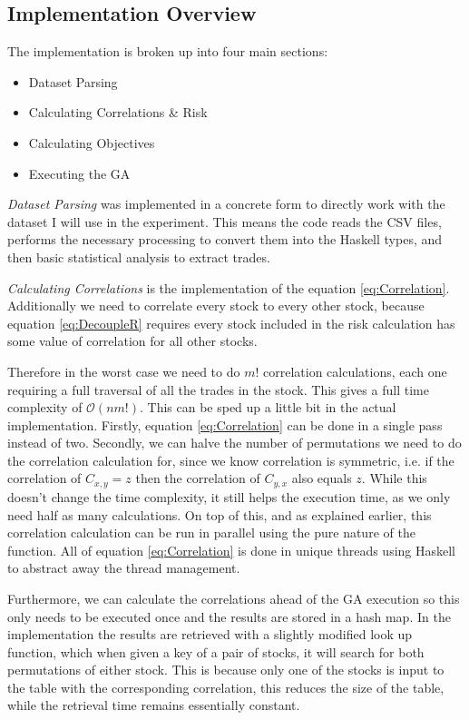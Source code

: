 \documentclass[11pt]{article}
\newcommand{\bigO}{\mathcal{O}}
\begin{document}
\subsection{Implementation Overview}

    The implementation is broken up into four main sections:

    \begin{itemize}
        \item{Dataset Parsing}
        \item{Calculating Correlations \& Risk}
        \item{Calculating Objectives}
        \item{Executing the GA}
    \end{itemize}

    \textit{Dataset Parsing} was implemented in a concrete form to directly work with the
    dataset I will use in the experiment. This means the code reads the CSV files,
    performs the necessary processing to convert them into the Haskell types, and then
    basic statistical analysis to extract trades.

    \textit{Calculating Correlations} is the implementation of the equation \ref{eq:Correlation}.
    Additionally we need to correlate every stock to every other stock, because equation
    \ref{eq:DecoupleR} requires every stock included in the risk calculation has some value of
    correlation for all other stocks.

    Therefore in the worst case we need to do \(m!\) correlation calculations, each one requiring a
    full traversal of all the trades in the stock. This gives a full time complexity of 
    \(\bigO (nm!) \). This can be sped up a little bit in the actual implementation. Firstly,
    equation \ref{eq:Correlation} can be done in a single pass instead of two. Secondly, we can
    halve the number of permutations we need to do the correlation calculation for, since we know
    correlation is symmetric, i.e. if the correlation of \(C_{x,y} = z\) then the correlation
    of \(C_{y,x}\) also equals \(z\). While this doesn't change the time complexity, it still helps
    the execution time, as we only need half as many calculations. On top of this, and as explained
    earlier, this correlation calculation can be run in parallel using the pure nature of the function.
    All of equation \ref{eq:Correlation} is done in unique threads using Haskell to abstract away
    the thread management.

    Furthermore, we can calculate the correlations ahead of the GA execution so this only needs to be
    executed once and the results are stored in a hash map. In the implementation the results are
    retrieved
    with a slightly modified look up function, which when given a key of a pair of stocks, it will
    search for both permutations of either stock. This is because only one of the stocks is input to the
    table with the corresponding correlation, this reduces the size of the table, while the retrieval time
    remains essentially constant.
\end{document}
